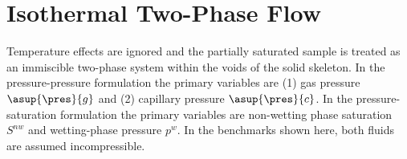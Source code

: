 %
\section{Isothermal Two-Phase Flow}
Temperature effects are ignored and the partially saturated sample is treated as an immiscible two-phase system within the voids of the solid skeleton. In the pressure-pressure formulation the primary variables are (1) gas pressure $\asup{\pres}{g}$ and (2) capillary pressure $\asup{\pres}{c}$. In the pressure-saturation formulation the primary variables are non-wetting phase saturation $S^{nw}$ and wetting-phase pressure $p^{w}$. In the benchmarks shown here, both fluids are assumed incompressible.


%
%
















